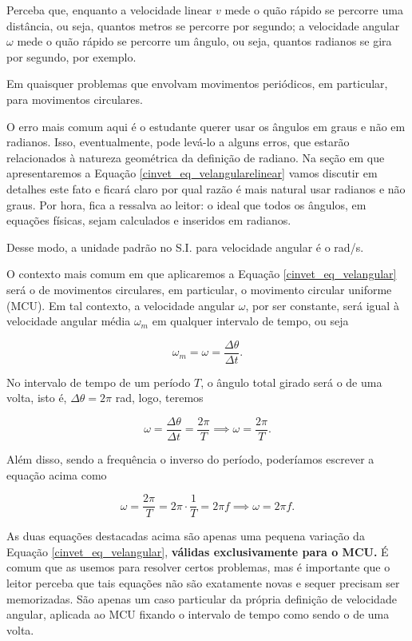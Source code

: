 Perceba que, enquanto a velocidade linear $v$ mede o quão rápido se percorre uma distância, ou seja, quantos metros se percorre por segundo; a velocidade angular $\omega$ mede o quão rápido se percorre um ângulo, ou seja, quantos radianos se gira por segundo, por exemplo.




Em quaisquer problemas que envolvam movimentos periódicos, em particular, para movimentos circulares.



O erro mais comum aqui é o estudante querer usar os ângulos em graus e não em radianos. Isso, eventualmente, pode levá-lo a alguns erros, que estarão relacionados à natureza geométrica da definição de radiano. Na seção em que apresentaremos a Equação \eqref{cinvet_eq_velangularelinear} vamos discutir em detalhes este fato e ficará claro por qual razão é mais natural usar radianos e não graus. Por hora, fica a ressalva ao leitor: o ideal que todos os ângulos, em equações físicas, sejam calculados e inseridos em radianos.

Desse modo, a unidade padrão no S.I. para velocidade angular é o rad/s.



O contexto mais comum em que aplicaremos a Equação \eqref{cinvet_eq_velangular} será o de movimentos circulares, em particular, o movimento circular uniforme (MCU). Em tal contexto, a velocidade angular $\omega$, por ser constante, será igual à velocidade angular média $\omega_m$ em qualquer intervalo de tempo, ou seja

$$ \omega_m = \omega = \dfrac{\Delta \theta}{\Delta t}.$$

No intervalo de tempo de um período $T$, o ângulo total girado será o de uma volta, isto é, $\Delta \theta = 2\pi$ rad, logo, teremos

$$ \omega =  \dfrac{\Delta \theta}{\Delta t} = \dfrac{2 \pi}{T} \implies \boxed{\omega =  \dfrac{2 \pi}{T} .}$$

Além disso, sendo a frequência o inverso do período, poderíamos escrever a equação acima como

$$ \omega = \dfrac{2 \pi}{T} = 2 \pi \cdot \dfrac{1}{T} = 2 \pi f \implies \boxed{\omega = 2 \pi f.}$$

As duas equações destacadas acima são apenas uma pequena variação da Equação \eqref{cinvet_eq_velangular}, \textbf{válidas exclusivamente para o MCU.} É comum que as usemos para resolver certos problemas, mas é importante que o leitor perceba que tais equações não são exatamente novas e sequer precisam ser memorizadas. São apenas um caso particular da própria definição de velocidade angular, aplicada ao MCU fixando o intervalo de tempo como sendo o de uma volta.

